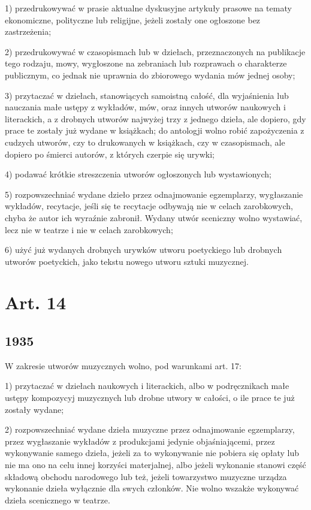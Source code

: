 \documentclass[withmarginpar]{book}
\begin{document}
1) przedrukowywać w prasie aktualne dyskusyjne artykuły prasowe na
tematy ekonomiczne, polityczne lub religijne, jeżeli zostały one
ogłoszone bez zastrzeżenia;

2) przedrukowywać w czasopismach lub w dziełach, przeznaczonych na
publikacje tego rodzaju, mowy, wygłoszone na zebraniach lub rozprawach
o charakterze publicznym, co jednak nie uprawnia do zbiorowego wydania
mów jednej osoby;

3) przytaczać w dziełach, stanowiących samoistną całość, dla
wyjaśnienia lub nauczania małe ustępy z wykładów, mów, oraz innych
utworów naukowych i literackich, a z drobnych utworów najwyżej trzy z
jednego dzieła, ale dopiero, gdy prace te zostały już wydane w
książkach; do antologji wolno robić zapożyczenia z cudzych utworów,
czy to drukowanych w książkach, czy w czasopismach, ale dopiero po
śmierci autorów, z których czerpie się urywki;

4) podawać krótkie streszczenia utworów ogłoszonych lub wystawionych;

5) rozpowszechniać wydane dzieło przez odnajmowanie egzemplarzy,
wygłaszanie wykładów, recytacje, jeśli się te recytacje odbywają nie w
celach zarobkowych, chyba że autor ich wyraźnie zabronił. Wydany utwór
sceniczny wolno wystawiać, lecz nie w teatrze i nie w celach
zarobkowych;

6) użyć już wydanych drobnych urywków utworu poetyckiego lub drobnych
utworów poetyckich, jako tekstu nowego utworu sztuki muzycznej.

\section{Art. 14}
\label{sec:art.-14}
\subsection{1935}
\label{sec:art.-14-1}

W zakresie utworów muzycznych wolno, pod warunkami art. 17:

1) przytaczać w dziełach naukowych i literackich, albo w podręcznikach
małe ustępy kompozycyj muzycznych lub drobne utwory w całości, o ile
prace te już zostały wydane;

2) rozpowszechniać wydane dzieła muzyczne przez odnajmowanie
egzemplarzy, przez wygłaszanie wykładów z produkcjami jedynie
objaśniającemi, przez wykonywanie samego dzieła, jeżeli za to
wykonywanie nie pobiera się opłaty lub nie ma ono na celu innej
korzyści materjalnej, albo jeżeli wykonanie stanowi część składową
obchodu narodowego lub też, jeżeli towarzystwo muzyczne urządza
wykonanie dzieła wyłącznie dla swych członków. Nie wolno wszakże
wykonywać dzieła scenicznego w teatrze.
\end{document}
